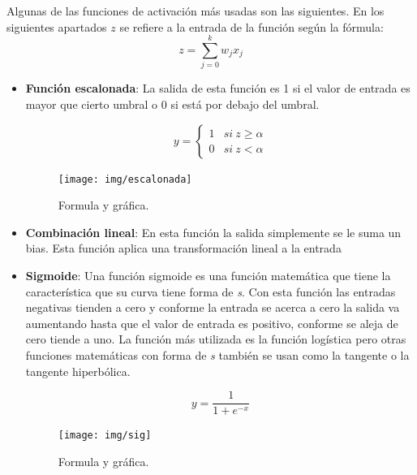 \documentclass[12pt,a4paper]{article}
\begin{document}
Algunas de las funciones de activación más usadas son las siguientes. En los siguientes apartados $z$ se refiere a la entrada de la función según la fórmula:
\begin{equation*}
z = \sum_{j=0}^{k} w_{j} x_{j}
\end{equation*}

\begin{itemize}
\item \textbf{Función escalonada}: La salida de esta función es 1 si el valor de entrada es mayor que cierto umbral o 0 si está por debajo del umbral.

\begin{figure}[H]
\centering\begin{minipage}[H]{0.5\textwidth}
\large
\begin{equation*}
y = \begin{cases}
1 & si \: z \geq \alpha \\
0 & si \: z < \alpha
\end{cases}
\end{equation*}
\end{minipage}%
\begin{minipage}[t]{0.5\textwidth}
\texttt{[image: img/escalonada]}
\end{minipage}
\caption{Formula y gráfica.}
\end{figure}

\item \textbf{Combinación lineal}: En esta función la salida simplemente se le suma un bias. Esta función aplica una transformación lineal a la entrada

\item \textbf{Sigmoide}: Una función sigmoide es una función matemática que tiene la característica que su curva tiene forma de \textit{s}. Con esta función las entradas negativas tienden a cero y conforme la entrada se acerca a cero la salida va aumentando hasta que el valor de entrada es positivo, conforme se aleja de cero tiende a uno. La función más utilizada es la función logística pero otras funciones matemáticas con forma de \textit{s} también se usan como la tangente o la tangente hiperbólica.

\begin{figure}[H]
\centering\begin{minipage}[H]{0.5\textwidth}
\large
\begin{equation*}
y = \frac{1}{1+e^{-x}}
\end{equation*}
\end{minipage}%
\begin{minipage}[t]{0.5\textwidth}
\texttt{[image: img/sig]}
\end{minipage}
\caption{Formula y gráfica.}
\end{figure}


\end{itemize}
\end{document}
